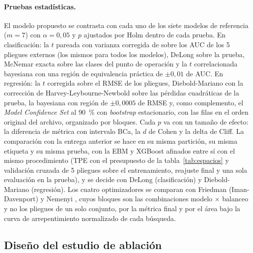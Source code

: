 \paragraph{Pruebas estadísticas.}
El modelo propuesto se contrasta con cada uno de los siete modelos de referencia ($m = 7$) con $\alpha = 0{,}05$
y $p$ ajustados por Holm dentro de cada prueba. En clasificación: la $t$ pareada con varianza corregida de
\citet{nadeau2003} sobre los AUC de los 5 pliegues externos (los mismos para todos los modelos), DeLong
\citep{delong1988} sobre la prueba, McNemar exacta \citep{mcnemar1947}
sobre las clases del punto de operación y la $t$ correlacionada bayesiana \citep{benavoli2017} con una región de
equivalencia práctica de $\pm 0{,}01$ de AUC. En regresión: la $t$ corregida sobre el RMSE de los pliegues,
Diebold-Mariano \citep{diebold1995} con la corrección de Harvey-Leybourne-Newbold sobre las pérdidas cuadráticas
de la prueba, la bayesiana con región de $\pm 0{,}0005$ de RMSE y, como complemento, el \emph{Model Confidence
Set} al 90~\% \citep{hansen2011mcs} con \emph{bootstrap} estacionario, con las filas en el orden original del
archivo, organizado por bloques. Cada $p$ va con un tamaño de efecto: la diferencia de métrica con intervalo BCa,
la $d$ de Cohen y la delta de Cliff. La comparación con la entrega anterior se hace en su misma partición, su
misma etiqueta y su misma prueba, con la EBM y XGBoost afinados entre sí con el mismo procedimiento (TPE con
el presupuesto de la tabla~\ref{tab:espacios} y validación cruzada de 5 pliegues sobre el entrenamiento,
reajuste final y una sola evaluación en la prueba), y se decide con DeLong (clasificación) y Diebold-Mariano
(regresión). Los cuatro optimizadores se comparan con Friedman (Iman-Davenport) y Nemenyi \citep{demsar2006},
cuyos bloques son las combinaciones modelo $\times$ balanceo y no los pliegues de un solo conjunto, por la
métrica final y por el área bajo la curva de arrepentimiento normalizado de cada búsqueda.

\subsection{Diseño del estudio de ablación}
\label{sec:ablacion}

